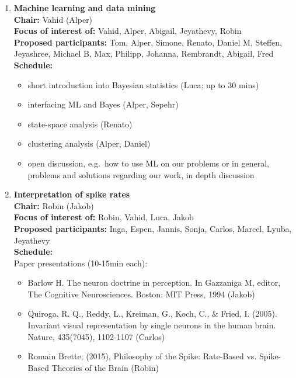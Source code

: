\documentclass[10pt, a4paper,twoside,american]{article}
\begin{document}
\begin{enumerate}[resume]
\item {\large\bf Machine learning and data mining}\\[1ex]
  {\bf Chair:} Vahid (Alper)\\[1ex]
  {\bf Focus of interest of:} Vahid, Alper, Abigail, Jeyathevy, Robin\\[1ex]
  {\bf Proposed participants:} Tom, Alper, Simone, Renato, Daniel M, Steffen, Jeyashree, Michael B, Max, Philipp, Johanna, Rembrandt, Abigail, Fred\\[1ex]
  {\bf Schedule:}
  \begin{itemize}
  \item short introduction into Bayesian statistics (Luca; up to 30 mins)
  \item interfacing ML and Bayes (Alper, Sepehr)
  \item state-space analysis (Renato)
  \item clustering analysis (Alper, Daniel)
  \item open discussion, e.g.~how to use ML on our problems or in general, problems and solutions regarding our work, in depth discussion
  \end{itemize}
\item {\large\bf Interpretation of spike rates}\\[1ex]
  {\bf Chair:} Robin (Jakob)\\[1ex]
  {\bf Focus of interest of:} Robin, Vahid, Luca, Jakob\\[1ex]
  {\bf Proposed participants:} Inga, Espen, Jannis, Sonja, Carlos, Marcel, Lyuba, Jeyathevy\\[1ex]
  {\bf Schedule:}\\[1ex]
  Paper presentations (10-15min each):
  \begin{itemize}
  \item Barlow H. The neuron doctrine in perception. In Gazzaniga M, editor, The Cognitive
    Neurosciences. Boston: MIT Press, 1994
    (Jakob)
  \item Quiroga, R. Q., Reddy, L., Kreiman, G., Koch, C., \& Fried, I. (2005). Invariant visual
    representation by single neurons in the human brain. Nature, 435(7045), 1102-1107 (Carlos)
  \item Romain Brette, (2015), Philosophy of the Spike: Rate-Based vs. Spike-Based Theories of the Brain (Robin)
  \end{itemize}
\end{enumerate}
\end{document}
